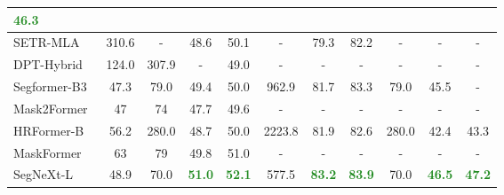 \documentclass{article}
\begin{document}
\begin{table}[t]
\begin{center}
{\begin{tabular}{l|c|ccc|ccc|ccc}
     \textbf{\textcolor{ForestGreen}{46.3}} \\  
\midrule
     SETR-MLA\cite{zheng2021rethinking} & 310.6 & - & 48.6 & 50.1 & - & 79.3 & 82.2 & - & - & - \\  
     DPT-Hybrid~\cite{ranftl2021vision} & 124.0 & 307.9 & - & 49.0 & - & - & - & - & - & - \\
     Segformer-B3~\cite{xie2021segformer} & 47.3 & 79.0 & 49.4 & 50.0 & 962.9 & 81.7 & 83.3 & 79.0 & 45.5 & - \\  
Mask2Former~\cite{cheng2021mask2former} & 47 & 74 & 47.7 & 49.6 & - & - & - & - & - & - \\ 
     HRFormer-B~\cite{yuan2021hrformer} & 56.2 & 280.0 & 48.7 & 50.0 & 2223.8 & 81.9 & 82.6 & 280.0 & 42.4 & 43.3 \\ 
     MaskFormer~\cite{cheng2021maskformer} & 63 & 79 & 49.8 & 51.0 & - & - & - & -  & - & -  \\ 
     SegNeXt-L  & 48.9 & 70.0 & \textbf{\textcolor{ForestGreen}{51.0}} & \textbf{\textcolor{ForestGreen}{52.1}} & 577.5 & \textbf{\textcolor{ForestGreen}{83.2}} & \textbf{\textcolor{ForestGreen}{83.9}} & 70.0 & \textbf{\textcolor{ForestGreen}{46.5}} & \textbf{\textcolor{ForestGreen}{47.2}} \\  
\bottomrule
\end{tabular}
}
\label{tab:ade20k_city_stuff}
\end{center}
\vspace{-0.5cm}
\end{table}
\end{document}
